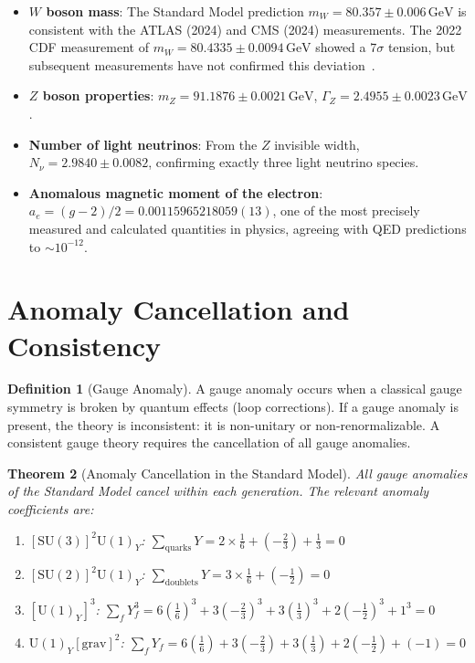 \documentclass[12pt]{article}
\newtheorem{theorem}{Theorem}[section]
\theoremstyle{definition}
\newtheorem{definition}[theorem]{Definition}
\theoremstyle{remark}
\newcommand{\GeV}{\,\mathrm{GeV}}
\begin{document}
\begin{itemize}
    \item \textbf{$W$ boson mass}: The Standard Model prediction $m_W = 80.357 \pm 0.006\GeV$ is consistent with the ATLAS (2024) and CMS (2024) measurements. The 2022 CDF measurement of $m_W = 80.4335 \pm 0.0094\GeV$ showed a $7\sigma$ tension, but subsequent measurements have not confirmed this deviation~\cite{ATLAS2024,CMS2024}.
    \item \textbf{$Z$ boson properties}: $m_Z = 91.1876 \pm 0.0021\GeV$, $\Gamma_Z = 2.4955 \pm 0.0023\GeV$.
    \item \textbf{Number of light neutrinos}: From the $Z$ invisible width, $N_\nu = 2.9840 \pm 0.0082$, confirming exactly three light neutrino species.
    \item \textbf{Anomalous magnetic moment of the electron}: $a_e = (g-2)/2 = 0.00115965218059(13)$, one of the most precisely measured and calculated quantities in physics, agreeing with QED predictions to $\sim 10^{-12}$.
\end{itemize}

\section{Anomaly Cancellation and Consistency}
\label{sec:anomalies}

\begin{definition}[Gauge Anomaly]
\label{def:anomaly}
A gauge anomaly occurs when a classical gauge symmetry is broken by quantum effects (loop corrections). If a gauge anomaly is present, the theory is inconsistent: it is non-unitary or non-renormalizable. A consistent gauge theory requires the cancellation of all gauge anomalies.
\end{definition}

\begin{theorem}[Anomaly Cancellation in the Standard Model]
\label{thm:anomalycancel}
All gauge anomalies of the Standard Model cancel within each generation. The relevant anomaly coefficients are:
\begin{enumerate}
    \item $[\mathrm{SU}(3)]^2 \mathrm{U}(1)_Y$: $\sum_{\mathrm{quarks}} Y = 2 \times \frac{1}{6} + (-\frac{2}{3}) + \frac{1}{3} = 0$
    \item $[\mathrm{SU}(2)]^2 \mathrm{U}(1)_Y$: $\sum_{\mathrm{doublets}} Y = 3 \times \frac{1}{6} + (-\frac{1}{2}) = 0$
    \item $[\mathrm{U}(1)_Y]^3$: $\sum_f Y_f^3 = 6(\frac{1}{6})^3 + 3(-\frac{2}{3})^3 + 3(\frac{1}{3})^3 + 2(-\frac{1}{2})^3 + 1^3 = 0$
    \item $\mathrm{U}(1)_Y [\mathrm{grav}]^2$: $\sum_f Y_f = 6(\frac{1}{6}) + 3(-\frac{2}{3}) + 3(\frac{1}{3}) + 2(-\frac{1}{2}) + (-1) = 0$
\end{enumerate}
\end{theorem}
\end{document}

